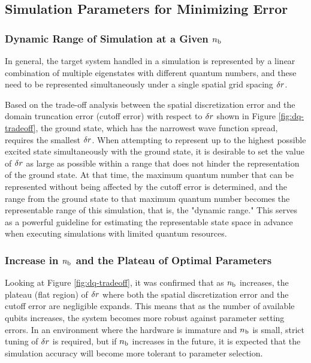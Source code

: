 \documentclass[wabun2025.tex]{subfiles}
\begin{document}
\subsection{Simulation Parameters for Minimizing Error}
\label{sec:parameter-selection-for-minimum-error-analysis}
\subsubsection{Dynamic Range of Simulation at a Given $n_{\mathrm{b}}$}
In general, the target system handled in a simulation is represented by a linear
combination of multiple eigenstates with different quantum numbers, and these
need to be represented simultaneously under a single spatial grid spacing
$\delta r$.

Based on the trade-off analysis between the spatial discretization error and the
domain truncation error (cutoff error) with respect to $\delta r$ shown in Figure
\ref{fig:dq-tradeoff}, the ground state, which has the narrowest wave function
spread, requires the smallest $\delta r$. When attempting to represent up to the
highest possible excited state simultaneously with the ground state, it is
desirable to set the value of $\delta r$ as large as possible within a range that
does not hinder the representation of the ground state. At that time, the
maximum quantum number that can be represented without being affected by the
cutoff error is determined, and the range from the ground state to that maximum
quantum number becomes the representable range of this simulation, that is, the
"dynamic range." This serves as a powerful guideline for estimating the
representable state space in advance when executing simulations with limited
quantum resources.

\subsubsection{Increase in $n_{\mathrm{b}}$ and the Plateau of Optimal Parameters}
Looking at Figure \ref{fig:dq-tradeoff}, it was confirmed that as $n_{\mathrm{b}}$
increases, the plateau (flat region) of $\delta r$ where both the spatial
discretization error and the cutoff error are negligible expands. This means
that as the number of available qubits increases, the system becomes more robust
against parameter setting errors. In an environment where the hardware is
immature and $n_{\mathrm{b}}$ is small, strict tuning of $\delta r$ is required, but if
$n_{\mathrm{b}}$ increases in the future, it is expected that the simulation accuracy will
become more tolerant to parameter selection.
\end{document}
